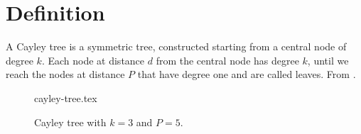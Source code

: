 \section{Definition}

    A Cayley tree is a symmetric tree, constructed starting from a central node of degree $k$. Each node at distance $d$ from the central node has degree $k$, until we reach the nodes at distance $P$ that have degree one and are called leaves. From \cite{barabasi}.

    \begin{figure}[H]
        \centering
        \def\svgwidth{0.5\textwidth}
        {cayley-tree.tex}

        \caption{Cayley tree with $k = 3$ and $P = 5$.}
    \end{figure}
